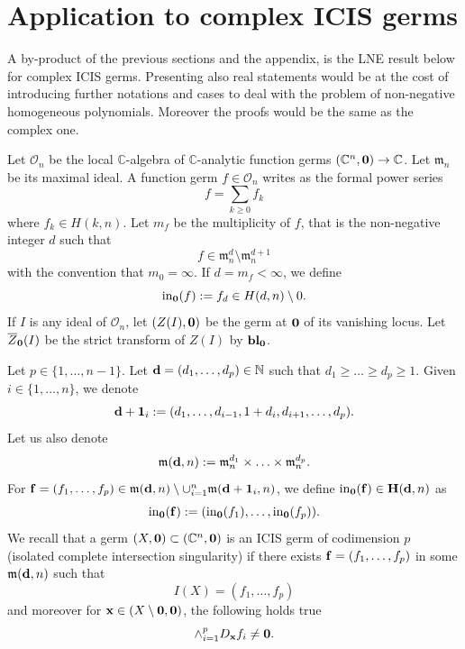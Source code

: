 \documentclass[11pt]{amsart}
\newcommand{\field}[1]{\mathbb{#1}}
\newcommand{\C}{\field{C}}
\newcommand{\N}{\field{N}}
\newcommand{\bun}{{\bf 1}}
\newcommand{\bbl}{{\bf bl}}
\newcommand{\bbo}{{\bf 0}}
\newcommand{\bd}{{\bf d}}
\newcommand{\bbf}{{\bf f}}
\newcommand{\bH}{{\bf H}}
\newcommand{\bx}{{\bf x}}
\newcommand{\Cn}{{\C^n}}
\newcommand{\cO}{\mathcal{O}}
\newcommand{\ini}{{\rm in}}
\newcommand{\mfrk}{\mathfrak{m}}
\newcommand{\Zbar}{\overline{Z}}
\numberwithin{equation}{section}
\numberwithin{equation}{section}
\begin{document}
%
%
%
%
%
%
%
%
%
%
%
%
%
%
%
%
%
%
%
%
%
%
%
%
%
% 
%
%
%
%
%
%
%
%
%
%
%
%
%
%
%
%
%
%
%
%
\section{Application to complex ICIS germs}\label{section:SAtICISG}
%
%
A by-product of the previous sections and the appendix, is the 
LNE result 
below for complex ICIS germs. Presenting also real statements would be 
at the cost of introducing further notations and cases to deal with the 
problem of non-negative homogeneous polynomials. Moreover the proofs would be 
the same as the complex one.

\bigskip
Let $\cO_n$ be the local $\C$-algebra of $\C$-analytic function germs 
$(\C^n,\bbo) \to \C$. Let $\mfrk_n$ be its maximal ideal. A function germ 
$f\in \cO_n$ writes as the formal power series
$$
f = \sum_{k\geq 0} f_k
$$
where $f_k \in H(k,n)$. Let $m_f$ be the multiplicity of $f$, that is the 
non-negative integer $d$ such that 
$$
f \in \mfrk_n^d \setminus \mfrk_n^{d+1}
$$
with the convention that $m_0 = \infty$. If $d = m_f < \infty$, we define
$$
\ini_\bbo(f) := f_d \in H(d,n)\setminus 0.
$$
If $I$ is any ideal of $\cO_n$,
let $(Z(I),\bbo)$ be the germ at $\bbo$ of its vanishing locus.
Let
$\Zbar_\bbo(I)$ be the strict transform of $Z(I)$ by $\bbl_\bbo$.

\medskip
Let $p \in \{1,\ldots,n-1\}$. Let $\bd = (d_1,\ldots,d_p) \in \N$ such that
$d_1\geq \ldots \geq d_p \geq 1$. Given $i \in \{1,\ldots,n\}$, we denote
$$
\bd + \bun_i := (d_1, \ldots,d_{i-1},1+d_i,d_{i+1},\ldots,d_p).
$$
Let us also denote 
$$
\mfrk(\bd,n) := \mfrk_n^{d_1}\times \ldots \times \mfrk_n^{d_p}.
$$
For $\bbf = (f_1,\ldots,f_p) \in \mfrk(\bd,n)\setminus \cup_{i=1}^n 
\mfrk(\bd+\bun_i,n)$, we define $\ini_\bbo(\bbf) \in \bH(\bd,n)$ as
$$
\ini_\bbo(\bbf) := (\ini_\bbo(f_1),\ldots,\ini_\bbo(f_p)).
$$
We recall that a germ $(X,\bbo) \subset (\Cn,\bbo)$ is an ICIS germ of 
codimension
$p$ (isolated complete intersection singularity) if there exists 
$\bbf = (f_1,\ldots,f_p)$ in some $\mfrk(\bd,n)$ such that 
$$
I(X) = (f_1,\ldots,f_p)
$$
and moreover for $\bx \in (X\setminus \bbo,\bbo)$, the following holds true
$$
\wedge_{i=1}^p D_\bx f_i \neq \bbo.
$$
\end{document}
